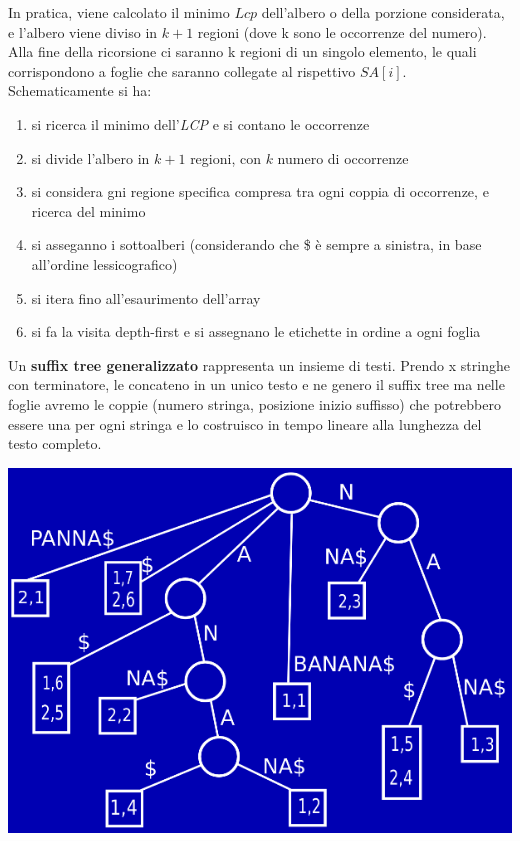 \documentclass[a4paper,12pt, oneside]{book}
\begin{document}
In pratica, viene calcolato il minimo $Lcp$ dell’albero o della porzione
considerata, e l’albero viene 
diviso in $k + 1$ regioni (dove k sono le occorrenze del numero). Alla
fine della ricorsione ci saranno 
k regioni di un singolo elemento, le quali corrispondono a foglie che
saranno collegate al rispettivo $SA[i]$.
Schematicamente si ha:
\begin{enumerate}
  \item si ricerca il minimo dell'\textit{LCP} e si contano le
  occorrenze
  \item si divide l'albero in $k+1$ regioni, con $k$ numero di
  occorrenze
  \item si considera gni regione specifica compresa tra ogni coppia di
  occorrenze, e ricerca del minimo
  \item si asseganno i sottoalberi (considerando che \$ è sempre a
  sinistra, in base all’ordine lessicografico)
  \item si itera fino all'esaurimento dell'array
  \item si fa la visita depth-first e si assegnano le etichette in
  ordine a ogni foglia
\end{enumerate}
Un \textbf{suffix tree generalizzato} rappresenta un insieme di
testi. Prendo x stringhe con terminatore, le concateno in un unico
testo e ne genero il suffix tree ma nelle foglie avremo le coppie
(numero stringa, posizione inizio suffisso) che potrebbero essere una
per ogni stringa e lo costruisco in tempo lineare alla lunghezza del
testo completo.
\begin{center}
  \includegraphics[scale = 0.5]{img/suf7.png}
\end{center}
\end{document}
